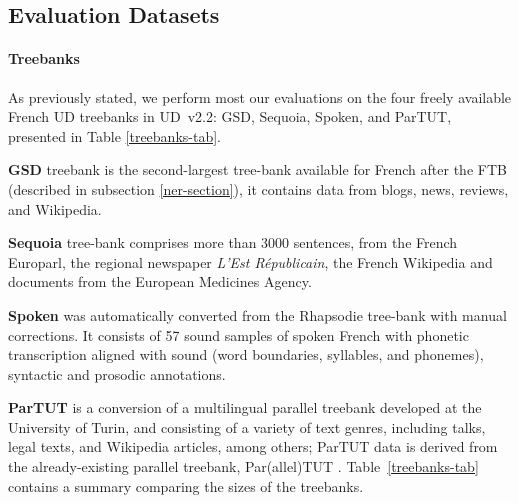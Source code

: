 \subsection{Evaluation Datasets}

\paragraph{Treebanks}
As previously stated, we perform most our evaluations on the four freely available French UD treebanks in UD~v2.2: GSD, Sequoia, Spoken, and ParTUT, presented in Table \ref{treebanks-tab}.

\textbf{GSD} treebank \citep{mcdonald-etal-2013-universal} is the second-largest tree-bank available for French after the FTB (described in subsection \ref{ner-section}), it contains data from blogs, news, reviews, and Wikipedia.

\textbf{Sequoia} tree-bank \citep{candito-etal-2014-deep} comprises more than 3000 sentences, from the French Europarl, the regional newspaper \emph{L’Est Républicain}, the French Wikipedia and documents from the European Medicines Agency.

\textbf{Spoken} was automatically converted from the Rhapsodie tree-bank \citep{lacheret-etal-2014-rhapsodie} with manual corrections. It consists of 57 sound samples of spoken French with phonetic transcription aligned with sound (word boundaries, syllables, and phonemes), syntactic and prosodic annotations.

\textbf{ParTUT} is a conversion of a multilingual parallel treebank developed at the University of Turin, and consisting of a variety of text genres, including talks, legal texts, and Wikipedia articles, among others; ParTUT data is derived from the already-existing parallel treebank, Par(allel)TUT \citep{sanguinetti-Bosco-2015-parttut}. Table~\ref{treebanks-tab} contains a summary comparing the sizes of the treebanks.


